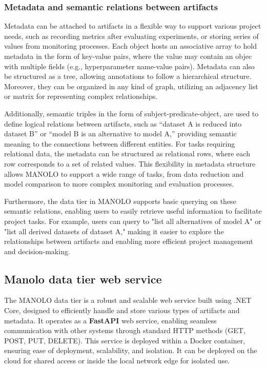 \subsubsection{Metadata and semantic relations between artifacts}

Metadata can be attached to artifacts in a flexible way to support various project needs, such as recording metrics after evaluating experiments, or storing series of values from monitoring processes. Each object hosts an associative array to hold metadata in the form of key-value pairs, where the value may contain an objec with multiple fields (e.g., hyperparameter name-value pairs). Metadata can also be structured as a tree, allowing annotations to follow a hierarchical structure. Moreover, they can be organized in any kind of graph, utilizing an adjacency list or matrix for representing complex relationships.

Additionally, semantic triples in the form of subject-predicate-object, are used to define logical relations between artifacts, such as “dataset A is reduced into dataset B” or “model B is an alternative to model A,” providing semantic meaning to the connections between different entities. For tasks requiring relational data, the metadata can be structured as relational rows, where each row corresponds to a set of related values. This flexibility in metadata structure allows MANOLO to support a wide range of tasks, from data reduction and model comparison to more complex monitoring and evaluation processes.

Furthermore, the data tier in MANOLO supports basic querying on these semantic relations, enabling users to easily retrieve useful information to facilitate project tasks. For example, users can query to "list all alternatives of model A" or "list all derived datasets of dataset A," making it easier to explore the relationships between artifacts and enabling more efficient project management and decision-making.

\subsection{Manolo data tier web service}
The MANOLO data tier is a robust and scalable web service built using .NET Core, designed to efficiently handle and store various types of artifacts and metadata. It operates as a \textbf{FastAPI} web service, enabling seamless communication with other systems through standard HTTP methods (GET, POST, PUT, DELETE). This service is deployed within a Docker container, ensuring ease of deployment, scalability, and isolation. It can be deployed on the cloud for shared access or inside the local network edge for isolated use.


